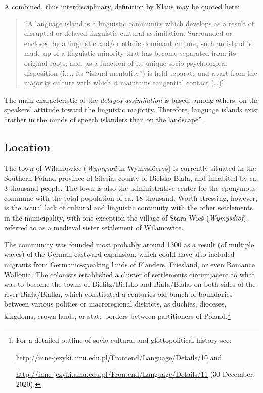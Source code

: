 \documentclass[output=paper]{langscibook}
\begin{document}
A combined, thus interdisciplinary, definition by Klaus \citet{mattheier_methoden_1996} may be quoted here: 

\begin{quote}
    “A language island is a linguistic community which develops as a result of disrupted or delayed linguistic cultural assimilation. Surrounded or enclosed by a linguistic and/or ethnic dominant culture, such an island is made up of a linguistic minority that has become separated from its original roots; and, as a function of its unique socio-psychological disposition (i.e., its ``island mentality'') is held separate and apart from the majority culture with which it maintains tangential contact (\ldots)” 
\end{quote}

The main characteristic of the \textit{delayed assimilation} is based, among others, on the speakers’ attitude toward the linguistic majority. Therefore, language islands exist “rather in the minds of speech islanders than on the landscape” \citep[106]{mattheier_theorie_1994}. 

\subsection{Location}
The town of Wilamowice (\textit{Wymysoü} in Wymysiöeryś) is currently situated in the Southern Poland province of Silesia, county of Bielsko-Biała, and inhabited by ca. 3 thousand people. The town is also the administrative center for the eponymous commune with the total population of ca. 18 thousand. Worth stressing, however, is the actual lack of cultural and linguistic continuity with the other settlements in the municipality, with one exception the village of Stara Wieś (\textit{Wymysdiöf}), referred to as a medieval sister settlement of Wilamowice.

The community was founded most probably around 1300 as a result (of multiple waves) of the German eastward expansion, which could have also included migrants from Germanic-speaking lands of Flanders, Friesland, or even Romance Wallonia. The colonists established a cluster of settlements circumjacent to what was to become the towns of Bielitz/Bielsko and Biała/Biala, on both sides of the river Biała/Bialka, which constituted a centuries-old bunch of boundaries between various polities or macroregional districts, as duchies, dioceses, kingdoms, crown-lands, or state borders between partitioners of Poland.\footnote{For a detailed outline of socio-cultural and glottopolitical history see: 

\url{http://inne-jezyki.amu.edu.pl/Frontend/Language/Details/10} and 

\url{http://inne-jezyki.amu.edu.pl/Frontend/Language/Details/11} (30 December, 2020).}
\end{document}
